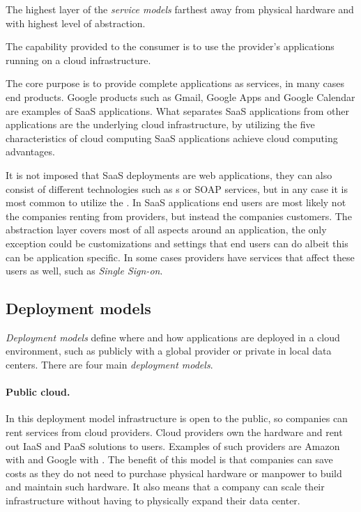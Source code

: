 The highest layer of the \emph{service models} farthest away from physical hardware
and with highest level of abstraction.
\epigraph{The capability provided to the consumer is to use the provider's 
  applications running on a cloud infrastructure.
}{\citet{nist:mell11}}

The core purpose is to provide complete applications as services, in many cases end products.
Google products such as Gmail, Google Apps and  Google Calendar are examples of 
SaaS applications.
What separates SaaS applications from other applications are the underlying cloud infrastructure,
by utilizing the five characteristics of cloud computing SaaS applications achieve 
cloud computing advantages.

It is not imposed that SaaS deployments are web applications, they can also consist of
different technologies such as  s or SOAP services, but in any case it is 
most common to utilize the .
In SaaS applications end users are most likely not the companies renting from providers, 
but instead the companies customers.
The abstraction layer covers most of all aspects around an application,
the only exception could be customizations and settings that end users can do albeit 
this can be application specific. In some cases providers have services that affect
these users as well, such as \emph{Single Sign-on}.

\subsection{Deployment models}

\emph{Deployment models} define where and how applications are deployed in a cloud environment,
such as publicly with a global provider or private in local data centers.
There are four main \emph{deployment models}.

\paragraph{Public cloud.}

In this deployment model infrastructure is open to the public,
so companies can rent services from cloud providers.
Cloud providers own the hardware and rent out IaaS and PaaS solutions to users.
Examples of such providers are Amazon with  and Google with .
The benefit of this model is that companies can save costs as 
they do not need to purchase physical hardware or manpower to build and maintain such hardware.
It also means that a company can scale their infrastructure without having to
physically expand their data center.

